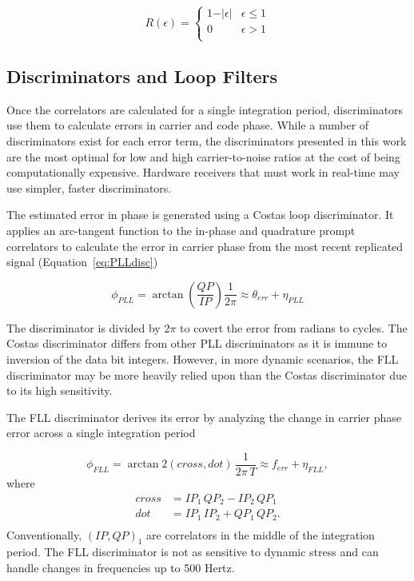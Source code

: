 \begin{equation}\label{eq:autocorrelation}
    R(\epsilon) =
    \begin{cases}
        1 - \vert \epsilon \vert & \epsilon \leq 1 \\
        0                        & \epsilon > 1    \\
    \end{cases}
\end{equation}

\subsection{Discriminators and Loop Filters}
Once the correlators are calculated for a single integration period, discriminators use them to calculate errors in carrier and code phase. While a number of discriminators exist for each error term, the discriminators presented in this work are the most optimal for low and high carrier-to-noise ratios at the cost of being computationally expensive. Hardware receivers that must work in real-time may use simpler, faster discriminators.

The estimated error in phase is generated using a Costas loop discriminator. It applies an arc-tangent function to the in-phase and quadrature prompt correlators to calculate the error in carrier phase from the most recent replicated signal (Equation~\ref{eq:PLLdisc})

\begin{equation}\label{eq:PLLdisc}
    \phi_{PLL} = \arctan\left(\frac{QP}{IP}\right) \frac{1}{2\pi} \approx \theta_{err} + \eta_{PLL}
\end{equation}

The discriminator is divided by \(2 \pi \) to covert the error from radians to cycles. The Costas discriminator differs from other PLL discriminators as it is immune to inversion of the data bit integers. However, in more dynamic scenarios, the FLL discriminator may be more heavily relied upon than the Costas discriminator due to its high sensitivity.

The FLL discriminator derives its error by analyzing the change in carrier phase error across a single integration period

\begin{equation}\label{eq:FLLdisc}
    \phi_{FLL} = \arctan2\left(cross,dot\right) \, \frac{1}{2\pi \,T} \approx f_{err} + \eta_{FLL},
\end{equation}
where
\begin{equation}\label{eq:crossdot}
    \begin{split}
        cross & = IP_1\,QP_2 - IP_2\,QP_1\\
        dot & = IP_1\,IP_2 + QP_1\,QP_2. \\
    \end{split}
\end{equation}
Conventionally, \({\left(IP,QP\right)}_1\) are correlators in the middle of the integration period. The FLL discriminator is not as sensitive to dynamic stress and can handle changes in frequencies up to 500 Hertz.

